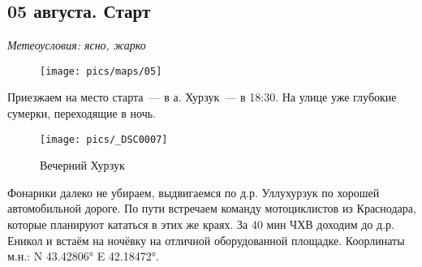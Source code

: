 \subsection{05 августа. Старт}
\textit{Метеоусловия: ясно, жарко}

\begin{figure}[h!]
	\centering
	\texttt{[image: pics/maps/05]}
	\label{fig:05}
\end{figure}

Приезжаем на место старта~--- в а. Хурзук~--- в 18:30. На улице уже глубокие сумерки, переходящие в ночь.

\begin{figure}[h!]
	\centering
	\texttt{[image: pics/\_DSC0007]}
	\caption{Вечерний Хурзук}
	\label{fig:_DSC0007}
\end{figure}

Фонарики далеко не убираем, выдвигаемся по д.р. Уллухурзук по хорошей автомобильной дороге. По пути встречаем команду мотоциклистов из Краснодара, которые планируют кататься в этих же краях. За 40 мин ЧХВ доходим до д.р. Еникол и встаём на ночёвку на отличной оборудованной площадке. Коорлинаты м.н.: N 43.42806° E 42.18472°.

\clearpage